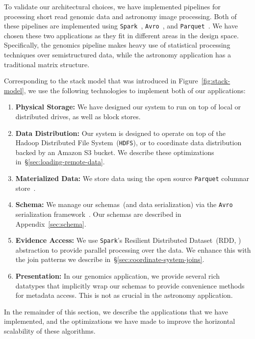 \documentclass{sig-alternate}
\begin{document}
To validate our architectural choices, we have implemented pipelines for processing short read genomic
data and astronomy image processing. Both of these pipelines are implemented using
\texttt{Spark}~\cite{zaharia10}, \texttt{Avro}~\cite{avro}, and \texttt{Parquet}~\cite{parquet}. We have chosen these two
applications as they fit in different areas in the design space. Specifically, the genomics pipeline makes
heavy use of statistical processing techniques over semistructured data, while the astronomy application
has a traditional matrix structure.

Corresponding to the stack model that was introduced in Figure~\ref{fig:stack-model}, we use the
following technologies to implement both of our applications:

\begin{enumerate}
\item \textbf{Physical Storage:} We have designed our system to run on top of local or distributed
drives, as well as block stores.
\item \textbf{Data Distribution:} Our system is designed to operate on top of the Hadoop Distributed File \linebreak
System~(\texttt{HDFS}), or to coordinate data distribution \linebreak backed by an Amazon
S3 bucket. We describe these optimizations in~\S\ref{sec:loading-remote-data}.
\item \textbf{Materialized Data:} We store data using the open source \texttt{Parquet} columnar store~\cite{parquet}.
\item \textbf{Schema:} We manage our schemas~(and data serialization) via the \texttt{Avro} serialization
framework~\cite{avro}. Our schemas are described in Appendix~\ref{sec:schema}.
\item \textbf{Evidence Access:} We use \texttt{Spark}'s Resilient \linebreak Distributed Dataset~(RDD, \cite{zaharia12})
abstraction to provide parallel processing over the data. We enhance this with the join patterns we
describe in~\S\ref{sec:coordinate-system-joins}.
\item \textbf{Presentation:} In our genomics application, we provide several rich datatypes that implicitly
wrap our schemas to provide convenience methods for metadata access. This is not as crucial in the
astronomy application.
\end{enumerate}

In the remainder of this section, we describe the applications that we have implemented, and the
optimizations we have made to improve the horizontal scalability of these algorithms.
\end{document}

